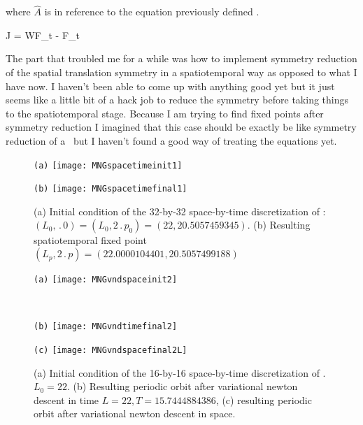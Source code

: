 where $\hat{A}$ is in reference to the equation previously defined .

\beq
J = W\cdot F_t - F_t\cdot {}
\eeq

The part that troubled me for a while was how to implement symmetry reduction of the spatial translation
symmetry in a spatiotemporal way as opposed to what I have now. I haven't been able to come
up with anything good yet but it just seems like a little bit of a hack job to reduce
the symmetry before taking things to the spatiotemporal stage. Because I am trying
to find fixed points after symmetry reduction I imagined that this case should be
exactly be like symmetry reduction of a \reqva\ but I haven't found a good way of treating
the equations yet.




\begin{figure}[ht]
\begin{minipage}[height=.32\textheight]{.45\textwidth}
\centering \small{\texttt{(a)}}
\texttt{[image: MNGspacetimeinit1]}
\end{minipage}
\begin{minipage}[height=.32\textheight]{.45\textwidth}
\centering \small{\texttt{(b)}}
\texttt{[image: MNGspacetimefinal1]}
\end{minipage}
\caption{ \label{fig:MNGspacetime11}
(a) Initial condition of the 32-by-32 space-by-time discretization of :
$(L_0,\period{0}) = (L_0, 2\period{p_0})= (22,20.5057459345)$.
(b) Resulting spatiotemporal fixed point
$(L_p,2\period{p}) =  (22.0000104401, 20.5057499188)$
}
\end{figure}

\begin{figure}
\begin{minipage}[height=.32\textheight]{.45\textwidth}
\centering \small{\texttt{(a)}}
\texttt{[image: MNGvndspaceinit2]}
\end{minipage}
\\
\begin{minipage}[height=.32\textheight]{.45\textwidth}
\centering \small{\texttt{(b)}}
\texttt{[image: MNGvndtimefinal2]}
\end{minipage}
\begin{minipage}[height=.32\textheight]{.45\textwidth}
\centering \small{\texttt{(c)}}
\texttt{[image: MNGvndspacefinal2L]}
\end{minipage}
\caption{ \label{fig:MNGspaceandtime1}
(a) Initial condition of the 16-by-16 space-by-time discretization of
. $L_0 = 22$.
(b) Resulting periodic orbit after variational {newton descent} in time $L =
22, T = 15.7444884386$,
(c) resulting periodic orbit after variational {newton descent} in space.
}
\end{figure}

